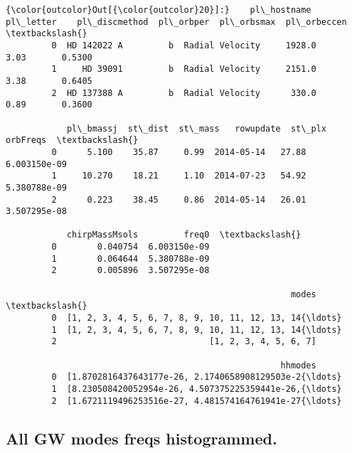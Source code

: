\documentclass[11pt]{article}
\begin{document}
\begin{Verbatim}[commandchars=\\\{\}]
{\color{outcolor}Out[{\color{outcolor}20}]:}    pl\_hostname pl\_letter    pl\_discmethod  pl\_orbper  pl\_orbsmax  pl\_orbeccen  \textbackslash{}
         0  HD 142022 A         b  Radial Velocity     1928.0        3.03       0.5300   
         1     HD 39091         b  Radial Velocity     2151.0        3.38       0.6405   
         2  HD 137388 A         b  Radial Velocity      330.0        0.89       0.3600   
         
            pl\_bmassj  st\_dist  st\_mass   rowupdate  st\_plx      orbFreqs  \textbackslash{}
         0      5.100    35.87     0.99  2014-05-14   27.88  6.003150e-09   
         1     10.270    18.21     1.10  2014-07-23   54.92  5.380788e-09   
         2      0.223    38.45     0.86  2014-05-14   26.01  3.507295e-08   
         
            chirpMassMsols         freq0  \textbackslash{}
         0        0.040754  6.003150e-09   
         1        0.064644  5.380788e-09   
         2        0.005896  3.507295e-08   
         
                                                        modes  \textbackslash{}
         0  [1, 2, 3, 4, 5, 6, 7, 8, 9, 10, 11, 12, 13, 14{\ldots}   
         1  [1, 2, 3, 4, 5, 6, 7, 8, 9, 10, 11, 12, 13, 14{\ldots}   
         2                              [1, 2, 3, 4, 5, 6, 7]   
         
                                                      hhmodes  
         0  [1.8702816437643177e-26, 2.1740658908129503e-2{\ldots}  
         1  [8.230508420052954e-26, 4.507375225359441e-26,{\ldots}  
         2  [1.6721119496253516e-27, 4.481574164761941e-27{\ldots}  
\end{Verbatim}
            
    \subsection{All GW modes freqs
histogrammed.}\label{all-gw-modes-freqs-histogrammed.}
\end{document}
